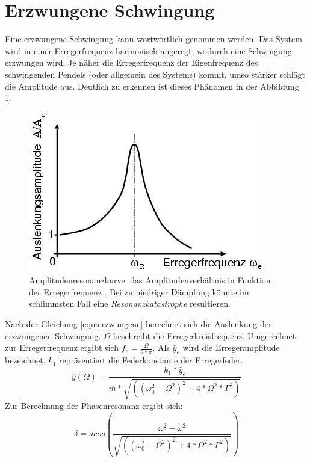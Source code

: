 \section{Erzwungene Schwingung}
Eine erzwungene Schwingung kann wortwörtlich genommen werden. Das System wird in einer Erregerfrequenz harmonisch angeregt, wodurch eine Schwingung erzwungen wird. Je näher die Erregerfrequenz der Eigenfrequenz des schwingenden Pendels (oder allgemein des Systems) kommt, umso stärker schlägt die Amplitude aus. Deutlich zu erkennen ist dieses Phänomen in der Abbildung \ref{fig:erzwungeneSchwingung}.
\begin{figure}
	\vspace{-20pt}
	\begin{center}
		\includegraphics[scale=0.62]{Bilder/erzwungene_schwingung.png} 
	\end{center}
	\vspace{-20pt}
	\caption{Amplitudenresonanzkurve: das Amplitudenverhältnis in Funktion der Erregerfrequenz \cite{LP}. 		Bei zu niedriger Dämpfung könnte im schlimmsten Fall eine \textit{Resonanzkatastrophe} resultieren.}
	\label{fig:erzwungeneSchwingung}
	\vspace{-10pt}
\end{figure}
Nach der Gleichung \ref{equ:erzwungene} berechnet sich die Auslenkung der erzwungenen Schwingung. $\Omega$ beschreibt die Erregerkreisfrequenz. Umgerechnet zur Erregerfrequenz ergibt sich $f_{e} = \frac{\Omega}{2*\pi}$. Als $\hat{y}_{e}$ wird die Erregeramplitude bezeichnet. $k_{1}$ repräsentiert die Federkonstante der Erregerfeder.\\
\begin{equation}
\hat{y}(\Omega) = \frac{k_{1} * \hat{y}_{e}}{m*\sqrt{((\omega_{0}^{2}-\Omega^{2})^{2}+4*\Omega^{2}*\Gamma^{2})}}
\label{equ:erzwungene}
\end{equation}
Zur Berechnung der Phasenresonanz ergibt sich:
\begin{equation}
\delta=acos(\frac{\omega_{0}^{2}-\omega^{2}}{\sqrt{((\omega_{0}^{2}-\Omega^{2})^{2}+4*\Omega^{2}*\Gamma^{2})}})
\label{equ:phasenresonanz}
\end{equation}